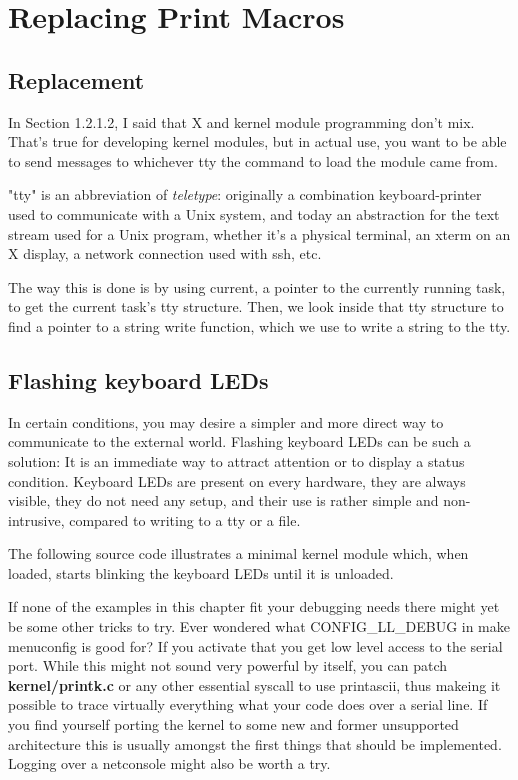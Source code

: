 \documentclass[10pt, oneside]{book}
\begin{document}

\section{Replacing Print Macros}
\label{sec:org2f44fc3}
\subsection{Replacement}
\label{sec:orgb4ba543}
In Section 1.2.1.2, I said that X and kernel module programming don't mix. That's true for developing kernel modules, but in actual use, you want to be able to send messages to whichever tty the command to load the module came from.

"tty" is an abbreviation of \emph{teletype}: originally a combination keyboard-printer used to communicate with a Unix system, and today an abstraction for the text stream used for a Unix program, whether it's a physical terminal, an xterm on an X display, a network connection used with ssh, etc.

The way this is done is by using current, a pointer to the currently running task, to get the current task's tty structure. Then, we look inside that tty structure to find a pointer to a string write function, which we use to write a string to the tty.


\subsection{Flashing keyboard LEDs}
\label{sec:orgf1c93f1}
In certain conditions, you may desire a simpler and more direct way to communicate to the external world. Flashing keyboard LEDs can be such a solution: It is an immediate way to attract attention or to display a status condition. Keyboard LEDs are present on every hardware, they are always visible, they do not need any setup, and their use is rather simple and non-intrusive, compared to writing to a tty or a file.

The following source code illustrates a minimal kernel module which, when loaded, starts blinking the keyboard LEDs until it is unloaded.


If none of the examples in this chapter fit your debugging needs there might yet be some other tricks to try. Ever wondered what CONFIG\_LL\_DEBUG in make menuconfig is good for? If you activate that you get low level access to the serial port. While this might not sound very powerful by itself, you can patch \textbf{kernel/printk.c} or any other essential syscall to use printascii, thus makeing it possible to trace virtually everything what your code does over a serial line. If you find yourself porting the kernel to some new and former unsupported architecture this is usually amongst the first things that should be implemented. Logging over a netconsole might also be worth a try.
\end{document}

